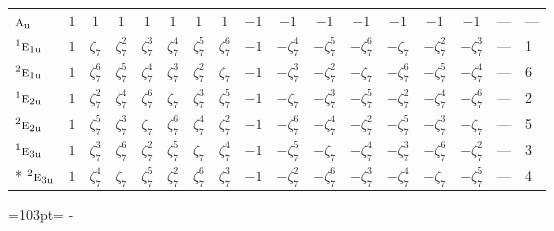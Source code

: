 \documentclass[10pt,a4paper]{article}
\newcommand{\needspace}[1]{\par\penalty-100\begingroup\dimen0=#1\relax\dimen2=\pagegoal
  \advance\dimen2-\pagetotal\ifdim\dimen0>\dimen2\relax\ifdim\dimen2>0pt\vfil\break\fi\fi
  \endgroup}
\numberwithin{equation}{section}
\newcommand{\irr}[1]{\text{\normalfont\scshape #1}}
\newcommand{\conjpair}[1]{{}^{#1}}
\newcommand{\ptag}[1]{\mathrm{#1}}
\newcommand{\rootunity}[1]{\zeta_{#1}}
\begin{document}
{\begin{longtable}{@{}lccccccccccccccll@{}}
$\irr{a}_{\ptag{u}}$ & $1$ & $1$ & $1$ & $1$ & $1$ & $1$ & $1$ & $-1$ & $-1$ & $-1$ & $-1$ & $-1$ & $-1$ & $-1$ & --- & ---\\
$\conjpair{1}\irr{e}_{1\ptag{u}}$ & $1$ & $\rootunity{7}$ & $\rootunity{7}^{2}$ & $\rootunity{7}^{3}$ & $\rootunity{7}^{4}$ & $\rootunity{7}^{5}$ & $\rootunity{7}^{6}$ & $-1$ & $-\rootunity{7}^{4}$ & $-\rootunity{7}^{5}$ & $-\rootunity{7}^{6}$ & $-\rootunity{7}$ & $-\rootunity{7}^{2}$ & $-\rootunity{7}^{3}$ & --- & 1\\
$\conjpair{2}\irr{e}_{1\ptag{u}}$ & $1$ & $\rootunity{7}^{6}$ & $\rootunity{7}^{5}$ & $\rootunity{7}^{4}$ & $\rootunity{7}^{3}$ & $\rootunity{7}^{2}$ & $\rootunity{7}$ & $-1$ & $-\rootunity{7}^{3}$ & $-\rootunity{7}^{2}$ & $-\rootunity{7}$ & $-\rootunity{7}^{6}$ & $-\rootunity{7}^{5}$ & $-\rootunity{7}^{4}$ & --- & 6\\
$\conjpair{1}\irr{e}_{2\ptag{u}}$ & $1$ & $\rootunity{7}^{2}$ & $\rootunity{7}^{4}$ & $\rootunity{7}^{6}$ & $\rootunity{7}$ & $\rootunity{7}^{3}$ & $\rootunity{7}^{5}$ & $-1$ & $-\rootunity{7}$ & $-\rootunity{7}^{3}$ & $-\rootunity{7}^{5}$ & $-\rootunity{7}^{2}$ & $-\rootunity{7}^{4}$ & $-\rootunity{7}^{6}$ & --- & 2\\
$\conjpair{2}\irr{e}_{2\ptag{u}}$ & $1$ & $\rootunity{7}^{5}$ & $\rootunity{7}^{3}$ & $\rootunity{7}$ & $\rootunity{7}^{6}$ & $\rootunity{7}^{4}$ & $\rootunity{7}^{2}$ & $-1$ & $-\rootunity{7}^{6}$ & $-\rootunity{7}^{4}$ & $-\rootunity{7}^{2}$ & $-\rootunity{7}^{5}$ & $-\rootunity{7}^{3}$ & $-\rootunity{7}$ & --- & 5\\
$\conjpair{1}\irr{e}_{3\ptag{u}}$ & $1$ & $\rootunity{7}^{3}$ & $\rootunity{7}^{6}$ & $\rootunity{7}^{2}$ & $\rootunity{7}^{5}$ & $\rootunity{7}$ & $\rootunity{7}^{4}$ & $-1$ & $-\rootunity{7}^{5}$ & $-\rootunity{7}$ & $-\rootunity{7}^{4}$ & $-\rootunity{7}^{3}$ & $-\rootunity{7}^{6}$ & $-\rootunity{7}^{2}$ & --- & 3\\*
$\conjpair{2}\irr{e}_{3\ptag{u}}$ & $1$ & $\rootunity{7}^{4}$ & $\rootunity{7}$ & $\rootunity{7}^{5}$ & $\rootunity{7}^{2}$ & $\rootunity{7}^{6}$ & $\rootunity{7}^{3}$ & $-1$ & $-\rootunity{7}^{2}$ & $-\rootunity{7}^{6}$ & $-\rootunity{7}^{3}$ & $-\rootunity{7}^{4}$ & $-\rootunity{7}$ & $-\rootunity{7}^{5}$ & --- & 4\\
\bottomrule\end{longtable}}
\needspace{103pt}
\end{document}
